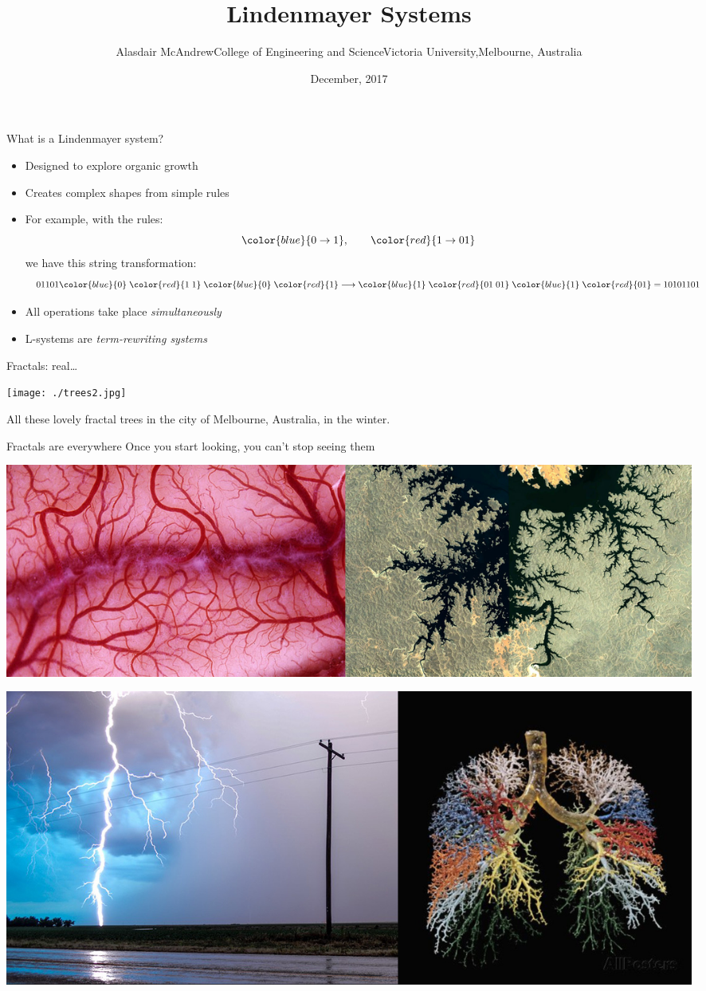 \documentclass[bigger]{beamer}
\author{Alasdair McAndrewCollege of Engineering and ScienceVictoria University,Melbourne, Australia}
\date{December, 2017}
\title{Lindenmayer Systems}
\begin{document}
\maketitle

\begin{frame}[label={sec:orgd2666d5}]{What is a Lindenmayer system?}
\begin{itemize}
\item Designed to explore organic growth
\item Creates complex shapes from simple rules
\item For example, with the rules:
\[
  \color{blue}{0\rightarrow 1},\qquad\color{red}{1\rightarrow 01}
  \]
we have this string transformation:
\[
  01101\color{blue}{0}\;\color{red}{1\;1}\;\color{blue}{0}\;\color{red}{1}
  \longrightarrow\color{blue}{1}\;\color{red}{01\;01}\;\color{blue}{1}\;\color{red}{01}=10101101
  \]
\item All operations take place \emph{simultaneously}
\item L-systems are \emph{term-rewriting systems}
\end{itemize}
\end{frame}

\begin{frame}[label={sec:orgbbb5c7c}]{Fractals: real\ldots{}}
\begin{center}
\texttt{[image: ./trees2.jpg]}
\end{center}

All these lovely fractal trees in the city of Melbourne, Australia, in the winter.
\end{frame}

\begin{frame}[label={sec:org55f0307}]{Fractals are everywhere}
Once you start looking, you can't stop seeing them

\begin{center}
\includegraphics[width=.9\linewidth]{./out1.jpg}
\end{center}

\begin{center}
\includegraphics[width=.9\linewidth]{./out2.jpg}
\end{center}
\end{frame}
\end{document}
